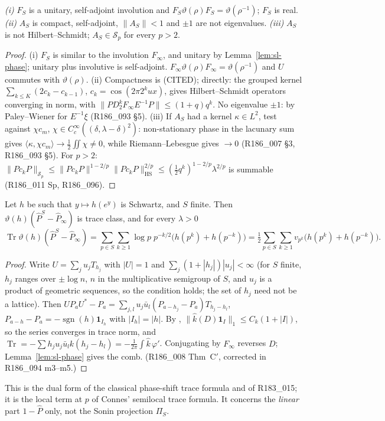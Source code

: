 \begin{proposition}\label{prop:sl-AS}
\emph{(i)} $F_S$ is a unitary, self-adjoint involution and $F_S\vartheta(\rho)F_S=\vartheta(\rho^{-1})$; $F_S$ is real.
\emph{(ii)} $A_S$ is compact, self-adjoint, $\|A_S\|<1$ and $\pm1$ are not eigenvalues.
\emph{(iii)} $A_S$ is not Hilbert--Schmidt; $A_S\in\mathcal S_p$ for every $p>2$.
\end{proposition}
\begin{proof}
(i) $F_S$ is similar to the involution $F_\infty$, and unitary by Lemma~\ref{lem:sl-phase}; unitary plus involutive is
self-adjoint. $F_\infty\vartheta(\rho)F_\infty=\vartheta(\rho^{-1})$ and $U$ commutes with $\vartheta(\rho)$.
(ii) Compactness is \cite[Thms.~2.1, 4.4]{CCquasi2020} (CITED); directly: the grouped kernel
$\sum_{k\le K}(2c_k-c_{k-1})$, $c_k=\cos(2\pi2^kux)$, gives Hilbert--Schmidt operators converging in norm, with
$\|PD_2^kF_\infty E^{-1}P\|\le(1+q)q^k$. No eigenvalue $\pm1$: by Paley--Wiener for $E^{-1}\xi$ (R186\_093 \S5).
(iii) If $A_S$ had a kernel $\kappa\in L^2$, test against $\chi c_m$, $\chi\in C_c^\infty((\delta,\lambda-\delta)^2)$:
non-stationary phase in the lacunary sum gives $\langle\kappa,\chi c_m\rangle\to\frac12\iint\chi\ne0$, while
Riemann--Lebesgue gives $\to0$ (R186\_007 \S3, R186\_093 \S5). For $p>2$:
$\|Pc_kP\|_{\mathcal S_p}\le\|Pc_kP\|^{1-2/p}\|Pc_kP\|_{\mathrm{HS}}^{2/p}\le(\tfrac12q^k)^{1-2/p}\lambda^{2/p}$ is summable
(R186\_011 Sp, R186\_096).
\end{proof}

\begin{lemma}\label{lem:sl-linear}
Let $h$ be such that $y\mapsto h(e^y)$ is Schwartz, and $S$ finite. Then $\vartheta(h)(\widehat P^S-\widehat P_\infty)$ is
trace class, and for every $\lambda>0$
\[
\operatorname{Tr}\vartheta(h)(\widehat P^S-\widehat P_\infty)=\sum_{p\in S}\sum_{k\ge1}\log p\;p^{-k/2}\big(h(p^k)+h(p^{-k})\big)
=\tfrac12\sum_{p\in S}\sum_{k\ge1}v_{p^k}\big(h(p^k)+h(p^{-k})\big).
\]
\end{lemma}
\begin{proof}
Write $U=\sum_ju_jT_{h_j}$ with $|U|=1$ and $\sum_j(1+|h_j|)|u_j|<\infty$ (for $S$ finite, $h_j$ ranges over
$\pm\log n$, $n$ in the multiplicative semigroup of $S$, and $u_j$ is a product of geometric sequences, so the
condition holds; the set of $h_j$ need not be a lattice). Then $UP_aU^*-P_a=\sum_{j,l}u_j\bar u_l(P_{a-h_j}-P_a)T_{h_j-h_l}$,
$P_{a-h}-P_a=-\operatorname{sgn}(h)\mathbf 1_{I_h}$ with $|I_h|=|h|$. By \cite[Thm.~4.5]{Simon},
$\|\widehat k(D)\mathbf 1_I\|_1\le C_k(1+|I|)$, so the series converges in trace norm, and
$\operatorname{Tr}=-\sum h_ju_j\bar u_lk(h_j-h_l)=-\frac1{2\pi}\int\widehat k\,\varphi'$. Conjugating by $F_\infty$
reverses $D$; Lemma~\ref{lem:sl-phase} gives the comb. (R186\_008 Thm~C$'$, corrected in R186\_094 m3--m5.)
\end{proof}
This is the dual form of the classical phase-shift trace formula and of R183\_015; it is the local
term at $p$ of Connes' semilocal trace formula. It concerns the \emph{linear} part $1-\widehat P$ only, not the
Sonin projection $\Pi_S$.


